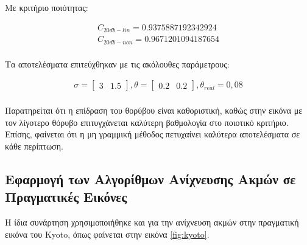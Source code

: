 \documentclass{article}
\newcommand{\eng}[1]{\foreignlanguage{english}{#1}}
\begin{document}
Με κριτήριο ποιότητας:

\begin{equation}
    \begin{gathered}
        C_{20db-lin} = 0.9375887192342924\\
        C_{20db-non} = 0.9671201094187654\\
    \end{gathered}
\end{equation}

Τα αποτελέσματα επιτεύχθηκαν με τις ακόλουθες παράμετρους:

\begin{equation}
    \begin{gathered}
        \sigma = \begin{bmatrix}3 & 1.5 \end{bmatrix},
        \theta = \begin{bmatrix}0.2 & 0.2 \end{bmatrix},
        \theta_{real} = 0,08\\
    \end{gathered}
\end{equation}

Παρατηρείται ότι η επίδραση του θορύβου είναι καθοριστική, καθώς στην εικόνα με τον λίγοτερο θόρυβο επιτυγχάνεται καλύτερη βαθμολογία στο ποιοτικό κριτήριο. Επίσης, φαίνεται ότι η μη γραμμική μέθοδος πετυχαίνει καλύτερα αποτελέσματα σε κάθε περίπτωση.

\subsection{Εφαρμογή των Αλγορίθμων Ανίχνευσης Ακμών σε Πραγματικές Εικόνες}

Η ίδια συνάρτηση χρησιμοποιήθηκε και για την ανίχνευση ακμών στην πραγματική εικόνα του \eng{Kyoto}, όπως φαίνεται στην εικόνα \ref{fig:kyoto}.
\end{document}
